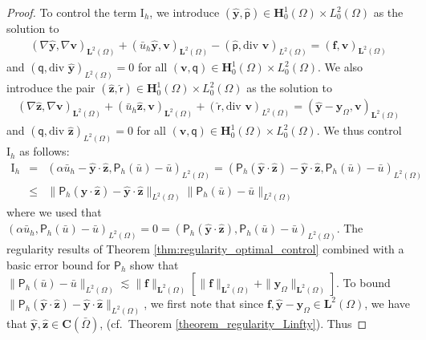 \documentclass[final]{siamart0216}
\begin{document}
\begin{proof}
To control the term $\text{I}_h$, we introduce $(\hat{\mathbf{y}},\hat{\mathsf{p}})\in \mathbf{H}_0^1(\Omega)\times L_0^2(\Omega)$ as the solution to
\begin{align}
\label{eq:aux_problem_adj_1_error}
(\nabla\hat{\mathbf{y}},\nabla \mathbf{v})_{\mathbf{L}^2(\Omega)}+( \bar{u}_{h}\hat{\mathbf{y}}, \mathbf{v})_{\mathbf{L}^2(\Omega)}-(\hat{\mathsf{p}},\text{div }\mathbf{v})_{L^2(\Omega)} =  	(\mathbf{f},\mathbf{v})_{\mathbf{L}^2(\Omega)}
\end{align}
and $(\mathsf{q},\text{div }\hat{\mathbf{y}})_{L^2(\Omega)} = 0$ for all $(\mathbf{v},\mathsf{q}) \in \mathbf{H}_0^1(\Omega) \times L_0^2(\Omega)$. We also introduce the pair $(\hat{\mathbf{z}},\hat{\mathsf{r}})\in \mathbf{H}_0^1(\Omega)\times L_0^2(\Omega)$ as the solution to
\begin{align}
\label{eq:aux_problem_adj_2_error}
(\nabla\hat{\mathbf{z}},\nabla \mathbf{v})_{\mathbf{L}^2(\Omega)}+( \bar{u}_{h}\hat{\mathbf{z}}, \mathbf{v})_{\mathbf{L}^2(\Omega)}+(\hat{\mathsf{r}},\text{div }\mathbf{v})_{L^2(\Omega)} = 	(\hat{\mathbf{y}}-\mathbf{y}_{\Omega},\mathbf{v})_{\mathbf{L}^2(\Omega)}
\end{align}
and $(\mathsf{q},\text{div }\hat{\mathbf{z}})_{L^2(\Omega)}  = 0$ for all $(\mathbf{v},\mathsf{q}) \in \mathbf{H}_0^1(\Omega) \times L_0^2(\Omega)$. We thus control $\text{I}_h$ as follows:
\begin{eqnarray*}
\text{I}_h 
&=&(\alpha \bar{u}_h-\hat{\mathbf{y}}\cdot\hat{\mathbf{z}},\mathsf{P}_h(\bar{u})-\bar{u})_{L^2(\Omega)}
=(\mathsf{P}_h(\hat{\mathbf{y}}\cdot\hat{\mathbf{z}})-\hat{\mathbf{y}}\cdot\hat{\mathbf{z}},\mathsf{P}_h(\bar{u})-\bar{u})_{L^2(\Omega)}
\\
&\leq & \|\mathsf{P}_h(\hat{\mathbf{y}}\cdot\hat{\mathbf{z}})-\hat{\mathbf{y}}\cdot\hat{\mathbf{z}}\|_{L^2(\Omega)} \|\mathsf{P}_h(\bar{u})-\bar{u}\|_{L^2(\Omega)}
\end{eqnarray*}
where we used that $(\alpha \bar{u}_h,\mathsf{P}_h(\bar{u})-\bar{u})_{L^2(\Omega)} = 0 = (\mathsf{P}_h(\hat{\mathbf{y}}\cdot\hat{\mathbf{z}}),\mathsf{P}_h(\bar{u})-\bar{u})_{L^2(\Omega)}$. The regularity results of Theorem \ref{thm:regularity_optimal_control} combined with a basic error bound for $\mathsf{P}_h$ show that $\|\mathsf{P}_h(\bar{u})-\bar{u}\|_{L^2(\Omega)} \lesssim \|\mathbf{f}\|_{\mathbf{L}^2(\Omega)}[\|\mathbf{f}\|_{\mathbf{L}^2(\Omega)}+\|\mathbf{y}_{\Omega}\|_{\mathbf{L}^2(\Omega)}]$. To bound $\|\mathsf{P}_h(\hat{\mathbf{y}}\cdot\hat{\mathbf{z}})-\hat{\mathbf{y}}\cdot\hat{\mathbf{z}}\|_{L^2(\Omega)}$, we first note that since $\mathbf{f}, \hat{\mathbf{y}}-\mathbf{y}_{\Omega} \in \mathbf{L}^2(\Omega)$, we have that $\hat{\mathbf{y}}, \hat{\mathbf{z}} \in \mathbf{C}(\bar \Omega)$, (cf.~Theorem \ref{theorem_regularity_Linfty}). Thus

\end{proof}
\end{document}
